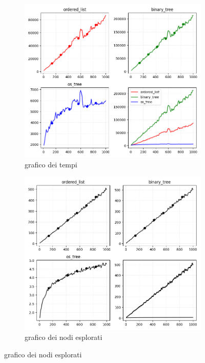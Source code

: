 \documentclass{article}
\begin{document}
\begin{figure}[htbp]
    \caption{\textbf{os\_rank}}
    \centering
    \begin{subfigure}[b]{0.45\textwidth}
        \includegraphics[width=\linewidth]{graphs3}
        \small
        \caption{grafico dei tempi}
    \end{subfigure}
    \hfill
    \begin{subfigure}[b]{0.45\textwidth}
        \includegraphics[width=\linewidth]{graphs4}
        \caption{grafico dei nodi esplorati}
    \end{subfigure}    
\end{figure}
\end{document}
